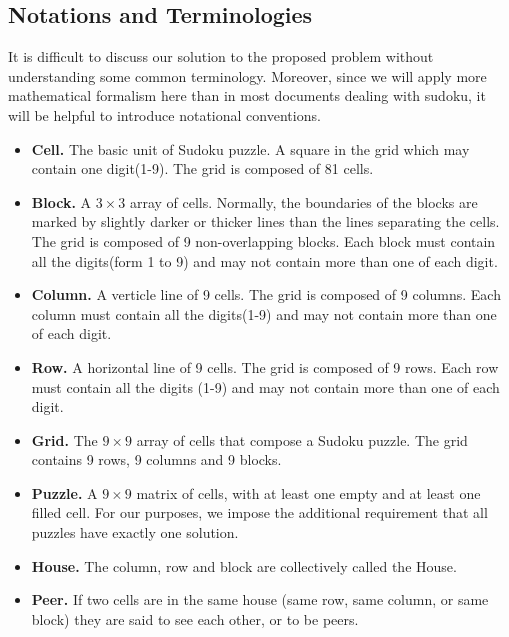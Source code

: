 \documentclass{mcmthesis}
\begin{document}

\subsection{Notations and Terminologies}
It is difficult to discuss our solution to the proposed problem without understanding some common
terminology. Moreover, since we will apply more mathematical formalism here than in most documents dealing with sudoku, it will be helpful to introduce notational conventions.

\begin{itemize}
	\item \textbf{Cell.} The basic unit of Sudoku puzzle. A square in the grid which may contain one digit(1-9). The grid is composed of 81 cells.

	\item \textbf{Block.} A $3\times3$ array of cells. Normally, the boundaries of the blocks are marked by slightly darker or thicker lines than the lines separating the cells. The grid is composed of 9 non-overlapping blocks. Each block must contain all the digits(form 1 to 9) and may not contain more than one of each digit.

	\item \textbf{Column.} A verticle line of 9 cells. The grid is composed of 9 columns. Each column must contain all the digits(1-9) and may not contain more than one of each digit.

	\item \textbf{Row.} A horizontal line of 9 cells. The grid is composed of 9 rows. Each row must contain all the digits (1-9) and may not contain more than one of each digit.

	\item \textbf{Grid.} The $9\times9$ array of cells that compose a Sudoku puzzle. The grid contains 9 rows, 9 columns and 9 blocks.

	\item \textbf{Puzzle.} A $9\times9$ matrix of cells, with at least one empty and at least one filled cell. For our purposes, we impose the additional requirement that all puzzles have exactly one solution. 	

	\item \textbf{House.} The column, row and block are collectively called the House.

	\item \textbf{Peer.} If two cells are in the same house (same row, same column, or same block) they are said to see each other, or to be peers.



\end{itemize}
\end{document}
